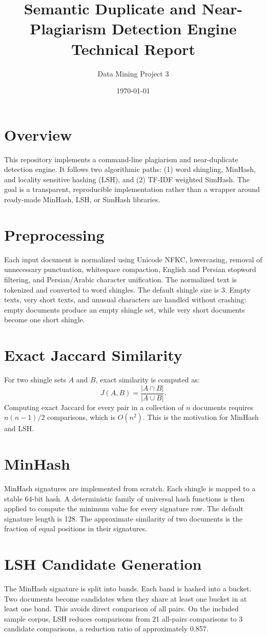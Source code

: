 \documentclass[11pt,a4paper]{article}
\title{Semantic Duplicate and Near-Plagiarism Detection Engine\\Technical Report}
\author{Data Mining Project 3}
\date{\today}
\begin{document}
\maketitle

\section{Overview}
This repository implements a command-line plagiarism and near-duplicate detection engine. It follows two algorithmic paths: (1) word shingling, MinHash, and locality sensitive hashing (LSH), and (2) TF-IDF weighted SimHash. The goal is a transparent, reproducible implementation rather than a wrapper around ready-made MinHash, LSH, or SimHash libraries.

\section{Preprocessing}
Each input document is normalized using Unicode NFKC, lowercasing, removal of unnecessary punctuation, whitespace compaction, English and Persian stopword filtering, and Persian/Arabic character unification. The normalized text is tokenized and converted to word shingles. The default shingle size is 3. Empty texts, very short texts, and unusual characters are handled without crashing: empty documents produce an empty shingle set, while very short documents become one short shingle.

\section{Exact Jaccard Similarity}
For two shingle sets $A$ and $B$, exact similarity is computed as:
\[
J(A,B)=\frac{|A\cap B|}{|A\cup B|}.
\]
Computing exact Jaccard for every pair in a collection of $n$ documents requires $n(n-1)/2$ comparisons, which is $O(n^2)$. This is the motivation for MinHash and LSH.

\section{MinHash}
MinHash signatures are implemented from scratch. Each shingle is mapped to a stable 64-bit hash. A deterministic family of universal hash functions is then applied to compute the minimum value for every signature row. The default signature length is 128. The approximate similarity of two documents is the fraction of equal positions in their signatures.

\section{LSH Candidate Generation}
The MinHash signature is split into bands. Each band is hashed into a bucket. Two documents become candidates when they share at least one bucket in at least one band. This avoids direct comparison of all pairs. On the included sample corpus, LSH reduces comparisons from 21 all-pairs comparisons to 3 candidate comparisons, a reduction ratio of approximately 0.857.
\end{document}
